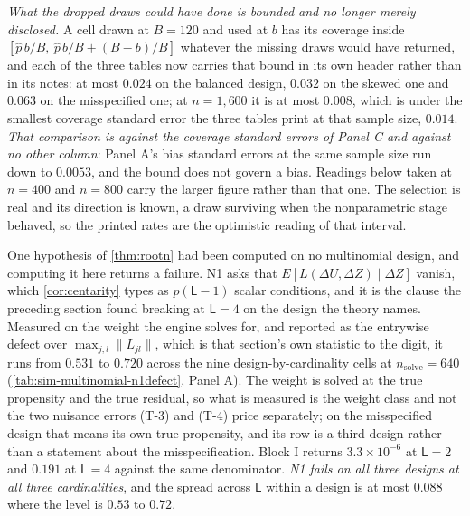 \documentclass[
  12pt]{article}
\newcommand{\1}[1]{\mathds{1}\left[#1\right]}
\theoremstyle{plain}
\theoremstyle{definition}
\theoremstyle{definition}
\theoremstyle{remark}
\begin{document}
\emph{What the dropped draws could have done is bounded and no longer merely
disclosed.} A cell drawn at $B=120$ and used at $b$ has its coverage inside
$[\hat p\,b/B,\ \hat p\,b/B+(B-b)/B]$ whatever the missing draws would have
returned, and each of the three tables now carries that bound in its own header
rather than in its notes: at most $0.024$ on the balanced design, $0.032$ on the
skewed one and $0.063$ on the misspecified one; at $n=1{,}600$ it is at most
$0.008$, which is under the smallest coverage standard error the three tables
print at that sample size, $0.014$. \emph{That comparison is against the coverage
standard errors of Panel C and against no other column}: Panel A's bias standard
errors at the same sample size run down to $0.0053$, and the bound does not
govern a bias. Readings below taken at $n=400$ and $n=800$ carry the
larger figure rather than that one.
The selection is real and its direction is known, a draw surviving when the
nonparametric stage behaved, so the printed rates are the optimistic reading of
that interval.

One hypothesis of \cref{thm:rootn} had been computed on no multinomial design,
and computing it here returns a failure. N1 asks that
$E[L(\Delta U,\Delta Z)\mid\Delta Z]$ vanish, which \cref{cor:centarity} types
as $p(\mathsf L-1)$ scalar conditions, and it is the clause the preceding
section found breaking at $\mathsf L=4$ on the design the theory names.
Measured on the weight the engine solves for, and reported as the entrywise
defect over $\max_{j,l}\|L_{jl}\|$, which is that section's own statistic to
the digit, it runs from $0.531$ to $0.720$ across the nine
design-by-cardinality cells at $n_{\mathrm{solve}}=640$
(\cref{tab:sim-multinomial-n1defect}, Panel A). The weight is solved at the true
propensity and the true residual, so what is measured is the weight class and not
the two nuisance errors (T-3) and (T-4) price separately; on the misspecified
design that means its own true propensity, and its row is a third design rather
than a statement about the misspecification. Block I returns
$3.3\times10^{-6}$ at $\mathsf L=2$ and $0.191$ at $\mathsf L=4$ against the
same denominator. \emph{N1 fails on all three designs at all three cardinalities},
and the spread across $\mathsf L$ within a design is at most $0.088$ where the
level is $0.53$ to $0.72$.
\end{document}

